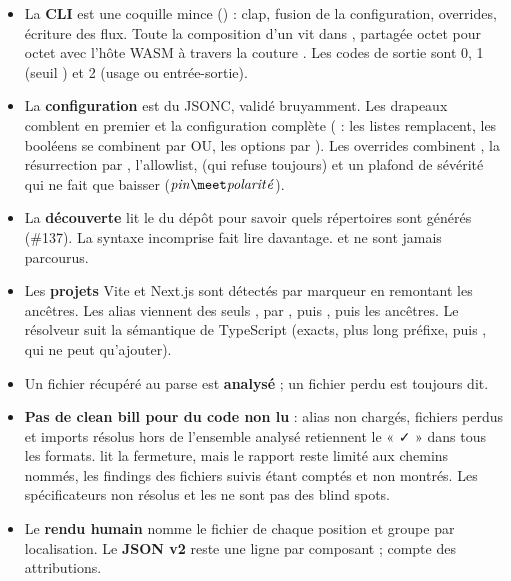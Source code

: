 \begin{resume}
\begin{itemize}
  \item La \textbf{CLI} est une coquille mince () : clap, fusion de la configuration, overrides, écriture des flux. Toute la composition d'un  vit dans , partagée octet pour octet avec l'hôte WASM à travers la couture . Les codes de sortie sont 0, 1 (seuil ) et 2 (usage ou entrée-sortie).
  \item La \textbf{configuration}  est du JSONC, validé bruyamment. Les drapeaux comblent en premier et la configuration complète ( : les listes remplacent, les booléens se combinent par OU, les options par ). Les overrides combinent , la résurrection par , l'allowlist,  (qui refuse toujours) et un plafond de sévérité qui ne fait que baisser ($\mathit{pin} \meet \mathit{polarit\acute{e}}$).
  \item La \textbf{découverte} lit le  du dépôt pour savoir quels répertoires sont générés (\#137). La syntaxe incomprise fait lire davantage.  et  ne sont jamais parcourus.
  \item Les \textbf{projets} Vite et Next.js sont détectés par marqueur en remontant les ancêtres. Les alias viennent des seuls , par , puis , puis les ancêtres. Le résolveur suit la sémantique de TypeScript (exacts, plus long préfixe, puis , qui ne peut qu'ajouter).
  \item Un fichier récupéré au parse est \textbf{analysé} ; un fichier perdu est toujours dit.
  \item \textbf{Pas de clean bill pour du code non lu} : alias non chargés, fichiers perdus et imports résolus hors de l'ensemble analysé retiennent le « ✓ » dans tous les formats.  lit la fermeture, mais le rapport reste limité aux chemins nommés, les findings des fichiers suivis étant comptés et non montrés. Les spécificateurs non résolus et les  ne sont pas des blind spots.
  \item Le \textbf{rendu humain} nomme le fichier de chaque position et groupe par localisation. Le \textbf{JSON v2} reste une ligne par composant ;  compte des attributions.

\end{itemize}
\end{resume}
